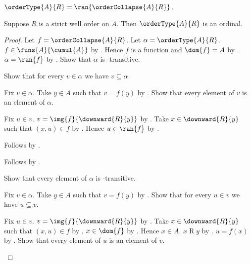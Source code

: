 \begin{definition}\label{order_type}
    $\orderType{A}{R}=\ran{\orderCollapse{A}{R}}$.
\end{definition}

\begin{theorem}\label{order_type_is_ordinal}
    Suppose $R$ is a strict well order on $A$.
    Then $\orderType{A}{R}$ is an ordinal.
\end{theorem}
\begin{proof}
    Let $f=\orderCollapse{A}{R}$.
    Let $\alpha=\orderType{A}{R}$.
    $f\in\funs{A}{\cumul{A}}$ by .
    Hence $f$ is a function and $\dom{f}=A$
        by .
    $\alpha=\ran{f}$ by .
    Show that $\alpha$ is \in-transitive.
    \begin{subproof}
        Show that for every $v\in\alpha$ we have $v\subseteq\alpha$.
        \begin{subproof}
            Fix $v\in\alpha$.
            Take $y\in A$ such that $v=f(y)$
                by .
            Show that every element of $v$ is an element of $\alpha$.
            \begin{subproof}
                Fix $u\in v$.
                $v=\img{f}{\downward{R}{y}}$
                    by .
                Take $x\in\downward{R}{y}$ such that $(x,u)\in f$
                    by .
                Hence $u\in\ran{f}$ by .
            \end{subproof}
            Follows by .
        \end{subproof}
        Follows by .
    \end{subproof}
    Show that every element of $\alpha$ is \in-transitive.
    \begin{subproof}
        Fix $v\in\alpha$.
        Take $y\in A$ such that $v=f(y)$
            by .
        Show that for every $u\in v$ we have $u\subseteq v$.
        \begin{subproof}
            Fix $u\in v$.
            $v=\img{f}{\downward{R}{y}}$
                by .
            Take $x\in\downward{R}{y}$ such that $(x,u)\in f$
                by .
            $x\in\dom{f}$ by .
            Hence $x\in A$.
            $x\mathrel{R}y$ by .
            $u=f(x)$ by .
            Show that every element of $u$ is an element of $v$.

\end{subproof}
\end{subproof}
\end{proof}
